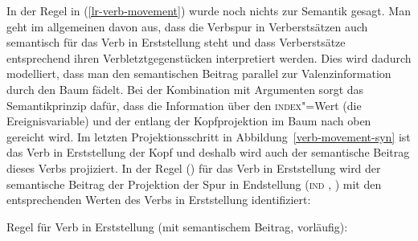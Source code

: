 In der Regel in (\ref{lr-verb-movement}) wurde noch nichts zur Semantik gesagt. Man geht im allgemeinen davon aus, dass
die Verbspur in Verberstsätzen auch semantisch für das Verb in Erststellung steht und
dass Verberstsätze entsprechend ihren Verbletztgegenstücken interpretiert werden. Dies
wird dadurch modelliert, dass man den semantischen Beitrag parallel zur Valenzinformation
durch den Baum fädelt. 
Bei der Kombination mit Argumenten sorgt das Semantikprinzip dafür, 
dass die Information über den \textsc{index}"=Wert (die Ereignisvariable) und der \ltopw entlang der Kopfprojektion im Baum nach
oben gereicht wird. Im letzten Projektionsschritt in Abbildung~\ref{verb-movement-syn}
ist das Verb in Erststellung der Kopf und deshalb wird auch der semantische Beitrag
dieses Verbs projiziert. In der Regel () für das Verb in Erststellung wird
der semantische Beitrag der Projektion der Spur in Endstellung (\textsc{ind} , \ltop {}) mit
den entsprechenden Werten des Verbs in Erststellung identifiziert:

\eas
\label{lr-verb-movement2}%
Regel für Verb in Erststellung (mit semantischem Beitrag, vorläufig):\\
 \impl\\
\zs

